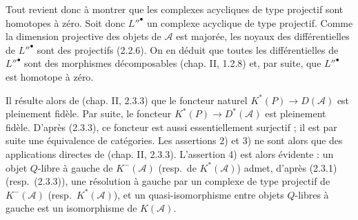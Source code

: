 Tout revient donc à montrer que les complexes acycliques de type projectif
sont homotopes à zéro. Soit donc ${L''}^\bullet$ un complexe acyclique de
type projectif. Comme la dimension projective des objets de $\mathcal A$
est majorée, les noyaux des différentielles de ${L''}^\bullet$ sont des
projectifs (2.2.6). On en déduit que toutes les différentielles de
${L''}^\bullet$ sont des morphismes décomposables (chap. II, 1.2.8) et,
par suite, que ${L''}^\bullet$ est homotope à zéro.

Il résulte alors de (chap. II, 2.3.3) que le foncteur naturel
$K^{*}(P)\longrightarrow D(\mathcal A)$ est pleinement fidèle. Par suite,
le foncteur $K^{*}(P)\longrightarrow D^{*}(\mathcal A)$ est pleinement
fidèle. D'après (2.3.3), ce foncteur est aussi essentiellement surjectif ;
il est par suite une équivalence de catégories. Les assertions 2) et 3) ne
sont alors que des applications directes de (chap. II, 2.3.3).
L'assertion 4) est alors évidente : un objet $Q$-libre à gauche de
$K^{-}(\mathcal A)$ (resp.\ de $K^{*}(\mathcal A)$) admet, d'après (2.3.1)
(resp.\ (2.3.3)), une résolution à gauche par un complexe de type projectif
de $K^{-}(\mathcal A)$ (resp.\ $K^{*}(\mathcal A)$), et un
quasi-isomorphisme entre objets $Q$-libres à gauche est un isomorphisme de
$K(\mathcal A)$.
\endgroup
